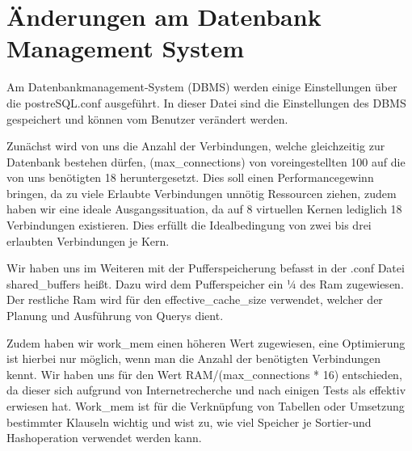 \section{Änderungen am Datenbank Management System}

Am Datenbankmanagement-System (DBMS) werden einige Einstellungen über die
postreSQL.conf ausgeführt. In dieser Datei sind die Einstellungen des DBMS
gespeichert und können vom Benutzer verändert werden.

Zunächst wird von uns die Anzahl der Verbindungen, welche gleichzeitig zur
Datenbank bestehen dürfen, (max\_connections) von voreingestellten 100 auf die
von uns benötigten 18 heruntergesetzt. Dies soll einen Performancegewinn
bringen, da zu viele Erlaubte Verbindungen unnötig Ressourcen ziehen, zudem
haben wir eine ideale Ausgangssituation, da auf 8 virtuellen Kernen lediglich
18 Verbindungen existieren. Dies erfüllt die Idealbedingung von zwei bis drei
erlaubten Verbindungen je Kern.

Wir haben uns im Weiteren mit der Pufferspeicherung befasst in der .conf Datei
shared\_buffers heißt. Dazu wird dem Pufferspeicher ein ¼ des Ram zugewiesen.
Der restliche Ram wird für den effective\_cache\_size verwendet, welcher der
Planung und Ausführung von Querys dient.

Zudem haben wir work\_mem einen höheren Wert zugewiesen, eine Optimierung ist
hierbei nur möglich, wenn man die Anzahl der benötigten Verbindungen kennt. Wir
haben uns für den Wert RAM/(max\_connections * 16) entschieden, da dieser sich
aufgrund von Internetrecherche und nach einigen Tests als effektiv erwiesen
hat. Work\_mem ist für die Verknüpfung von Tabellen oder Umsetzung bestimmter
Klauseln wichtig und wist zu, wie viel Speicher je Sortier-und Hashoperation
verwendet werden kann.

\clearpage